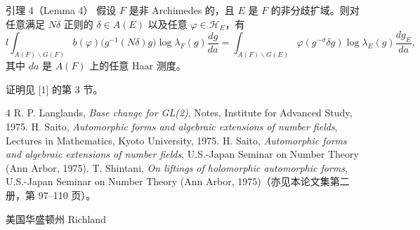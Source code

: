 \begin{originaltheorem}{引理 4（Lemma 4）}
假设 $F$ 是非 Archimedes 的，且 $E$ 是 $F$ 的非分歧扩域。则对任意满足 $N\delta$ 正则的 $\delta\in A(E)$ 以及任意 $\varphi\in\mathcal H_E$，有
\[
 l\int_{A(F)\backslash G(F)}b(\varphi)\bigl(g^{-1}(N\delta)g\bigr)
 \log\lambda_F(g)\frac{dg}{da}
 =\int_{A(F)\backslash G(E)}\varphi(g^{-\sigma}\delta g)
 \log\lambda_E(g)\frac{dg_E}{da},
\]
其中 $da$ 是 $A(F)$ 上的任意 Haar 测度。
\end{originaltheorem}

证明见 [1] 的第 3 节。

\begin{thebibliography}{4}
 R. P. Langlands, \emph{Base change for GL(2)}, Notes, Institute for Advanced Study, 1975.
 H. Saito, \emph{Automorphic forms and algebraic extensions of number fields}, Lectures in Mathematics, Kyoto University, 1975.
 H. Saito, \emph{Automorphic forms and algebraic extensions of number fields}, U.S.-Japan Seminar on Number Theory (Ann Arbor, 1975).
 T. Shintani, \emph{On liftings of holomorphic automorphic forms}, U.S.-Japan Seminar on Number Theory (Ann Arbor, 1975)（亦见本论文集第二册，第 97--110 页）。
\end{thebibliography}

\begin{flushleft}\small 美国华盛顿州 Richland\end{flushleft}
